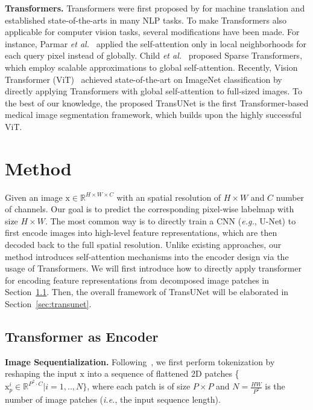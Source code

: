 \documentclass[runningheads]{llncs}
\begin{document}
\vspace{1ex}\noindent\textbf{Transformers.}
Transformers were first proposed by \cite{vaswani2017attention} for machine translation and established state-of-the-arts in many NLP tasks.
To make Transformers also applicable for computer vision tasks, several modifications have been made.
For instance, Parmar \emph{et al.}~\cite{parmar2018image} applied the self-attention only in local neighborhoods for each query pixel instead of globally.
Child \emph{et al.}~\cite{child2019generating} proposed Sparse Transformers, which employ scalable approximations to global self-attention.
Recently, Vision Transformer (ViT)~\cite{dosovitskiy2020image} achieved state-of-the-art on ImageNet classification by directly applying Transformers with global self-attention to full-sized images. 
To the best of our knowledge, the proposed TransUNet is the first Transformer-based medical image segmentation framework, which builds upon the highly successful ViT.


\section{Method}
Given an image $\bm{\mathrm{x}} \in \mathbb{R}^{H \times W \times C}$ with an spatial resolution of $H \times W$ and $C$ number of channels. Our goal is to predict the corresponding pixel-wise labelmap with size $H \times W$. The most common way is to directly train a CNN (\emph{e.g.}, U-Net) to first encode images into high-level feature representations, which are then decoded back to the full spatial resolution.
Unlike existing approaches, our method introduces self-attention mechanisms into the encoder design via the usage of Transformers.
We will first introduce how to directly apply transformer for encoding feature representations from decomposed image patches in Section~\ref{sec:transformer_encoder}.
Then, the overall framework of TransUNet will be elaborated in Section~\ref{sec:transunet}.

\subsection{Transformer as Encoder}
\label{sec:transformer_encoder}
\noindent\textbf{Image Sequentialization.} 
Following~\cite{dosovitskiy2020image}, we first perform tokenization by reshaping the input $\bm{\mathrm{x}}$ into a sequence of flattened 2D patches \{$\bm{\mathrm{x}}^i_p \in \mathbb{R}^{P^2 \cdot C}|i=1,..,N\}$, where each patch is of size $P \times P$ and $N=\frac{HW}{P^2}$ is the number of image patches (\emph{i.e.}, the input sequence length). %
\end{document}
